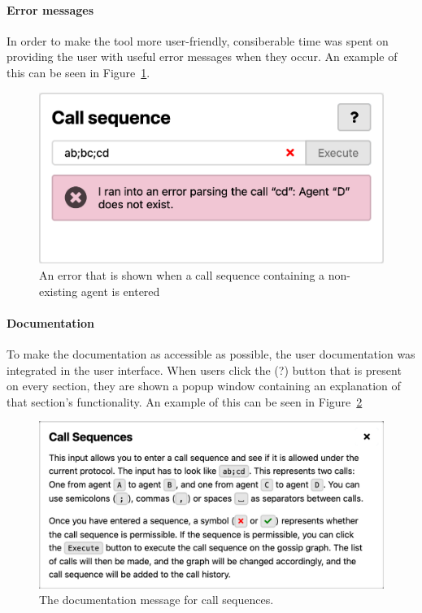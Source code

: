 \paragraph{Error messages}

In order to make the tool more user-friendly, consiberable time was spent on providing the user with useful error messages when they occur.
An example of this can be seen in Figure~\ref{fig:errors}.

\begin{figure}[htb!]
    \includegraphics[width=\linewidth]{img/errors.png}
    \caption{An error that is shown when a call sequence containing a non-existing agent is entered}
    \label{fig:errors}
\end{figure}

\paragraph{Documentation}

To make the documentation as accessible as possible, the user documentation was integrated in the user interface.
When users click the (?) button that is present on every section, they are shown a popup window containing an explanation of that section's functionality.
An example of this can be seen in Figure~\ref{fig:documentation}

\begin{figure}[htb!]
    \includegraphics[width=\linewidth]{img/documentation.png}
    \caption{The documentation message for call sequences.}
    \label{fig:documentation}
\end{figure}

